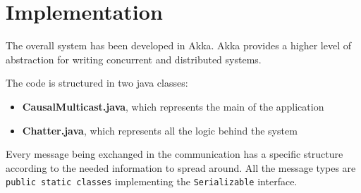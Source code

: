 \documentclass[conference]{IEEEtran}
\begin{document}

\section{Implementation}
The overall system has been developed in Akka. Akka provides a higher level of abstraction for writing concurrent and distributed systems.

The code is structured in two java classes:
\begin{itemize}
	\item \textbf{CausalMulticast.java}, which represents the main of 
	the application 
	\item \textbf{Chatter.java}, which represents all the logic behind
	the system
\end{itemize}
Every message being exchanged in the communication has a specific structure according to the needed information to spread around.  All the message types are \texttt{public static classes} implementing the \texttt{Serializable} interface.
\end{document}
